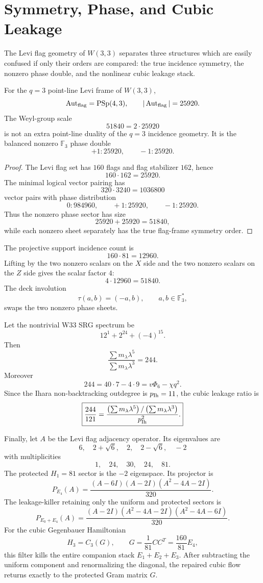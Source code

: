 \section{Symmetry, Phase, and Cubic Leakage}
\label{sec:symmetry-phase-cubic-leakage}

The Levi flag geometry of $W(3,3)$ separates three structures which are easily
confused if only their orders are compared: the true incidence symmetry, the
nonzero phase double, and the nonlinear cubic leakage stack.

\begin{theorem}
For the $q=3$ point-line Levi frame of $W(3,3)$,
\[
\operatorname{Aut}_{\rm flag}=\mathrm{PSp}(4,3),
\qquad
|\operatorname{Aut}_{\rm flag}|=25920.
\]
The Weyl-group scale
\[
51840=2\cdot25920
\]
is not an extra point-line duality of the $q=3$ incidence geometry.  It is the
balanced nonzero $\mathbb F_3$ phase double
\[
+1:25920,
\qquad
-1:25920.
\]
\end{theorem}

\begin{proof}
The Levi flag set has $160$ flags and flag stabilizer $162$, hence
\[
160\cdot162=25920.
\]
The minimal logical vector pairing has
\[
320\cdot3240=1036800
\]
vector pairs with phase distribution
\[
0:984960,\qquad +1:25920,\qquad -1:25920.
\]
Thus the nonzero phase sector has size
\[
25920+25920=51840,
\]
while each nonzero sheet separately has the true flag-frame symmetry order.
\end{proof}

The projective support incidence count is
\[
160\cdot81=12960.
\]
Lifting by the two nonzero scalars on the $X$ side and the two nonzero scalars
on the $Z$ side gives the scalar factor $4$:
\[
4\cdot12960=51840.
\]
The deck involution
\[
\tau(a,b)=(-a,b),\qquad a,b\in\mathbb F_3^*,
\]
swaps the two nonzero phase sheets.

\begin{theorem}
Let the nontrivial W33 SRG spectrum be
\[
12^1+2^{24}+(-4)^{15}.
\]
Then
\[
\frac{\sum m_\lambda\lambda^5}{\sum m_\lambda\lambda^3}=244.
\]
Moreover
\[
244=40\cdot7-4\cdot9=v\Phi_6-\chi q^2.
\]
Since the Ihara non-backtracking outdegree is $p_{\rm Ih}=11$, the cubic leakage
ratio is
\[
\boxed{
\frac{244}{121}=
\frac{\left(\sum m_\lambda\lambda^5\right)/\left(\sum m_\lambda\lambda^3\right)}{p_{\rm Ih}^2}.
}
\]
\end{theorem}

Finally, let $A$ be the Levi flag adjacency operator.  Its eigenvalues are
\[
6,\quad 2+\sqrt6,\quad 2,\quad 2-\sqrt6,\quad -2
\]
with multiplicities
\[
1,\quad24,\quad30,\quad24,\quad81.
\]
The protected $H_1=81$ sector is the $-2$ eigenspace.  Its projector is
\[
P_{E_4}(A)=
\frac{(A-6I)(A-2I)(A^2-4A-2I)}{320}.
\]
The leakage-killer retaining only the uniform and protected sectors is
\[
P_{E_0+E_4}(A)=
\frac{(A-2I)(A^2-4A-2I)(A^2-4A-6I)}{320}.
\]
For the cubic Gegenbauer Hamiltonian
\[
H_3=C_3(G),\qquad G=\frac1{81}CC^T=\frac{160}{81}E_4,
\]
this filter kills the entire companion stack $E_1+E_2+E_3$.  After subtracting
the uniform component and renormalizing the diagonal, the repaired cubic flow
returns exactly to the protected Gram matrix $G$.
